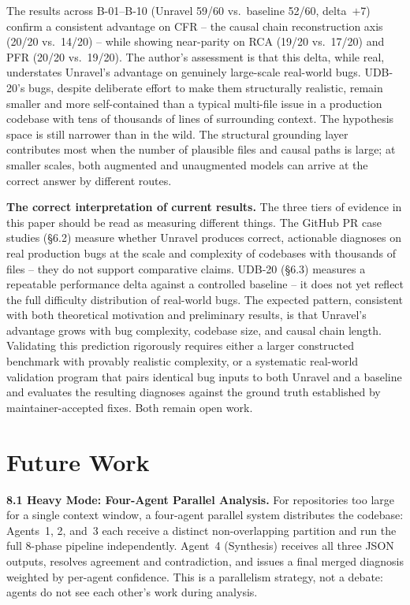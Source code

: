 \documentclass[12pt,a4paper]{article}
\begin{document}
The results across B-01--B-10 (Unravel 59/60 vs.\ baseline 52/60, delta~$+$7) confirm
a consistent advantage on CFR -- the causal chain reconstruction axis (20/20 vs.~14/20)
-- while showing near-parity on RCA (19/20 vs.~17/20) and PFR (20/20 vs.~19/20).
The author's assessment is that this delta, while real, understates Unravel's
advantage on genuinely large-scale real-world bugs. UDB-20's bugs, despite deliberate effort to make them structurally
realistic, remain smaller and more self-contained than a typical multi-file issue in a
production codebase with tens of thousands of lines of surrounding context. The
hypothesis space is still narrower than in the wild. The structural grounding layer
contributes most when the number of plausible files and causal paths is large; at
smaller scales, both augmented and unaugmented models can arrive at the correct answer
by different routes.

\textbf{The correct interpretation of current results.}
The three tiers of evidence in this paper should be read as measuring different things.
The GitHub PR case studies (\S6.2) measure whether Unravel produces correct, actionable
diagnoses on real production bugs at the scale and complexity of codebases with thousands
of files -- they do not support comparative claims. UDB-20 (\S6.3) measures a repeatable
performance delta against a controlled baseline -- it does not yet reflect the full
difficulty distribution of real-world bugs. The expected pattern, consistent with both
theoretical motivation and preliminary results, is that Unravel's advantage grows with
bug complexity, codebase size, and causal chain length. Validating this prediction
rigorously requires either a larger constructed benchmark with provably realistic
complexity, or a systematic real-world validation program that pairs identical bug
inputs to both Unravel and a baseline and evaluates the resulting diagnoses against
the ground truth established by maintainer-accepted fixes. Both remain open work.

\section{Future Work}

\textbf{8.1 \; Heavy Mode: Four-Agent Parallel Analysis.}
For repositories too large for a single context window, a four-agent parallel system
distributes the codebase: Agents~1, 2, and~3 each receive a distinct non-overlapping
partition and run the full 8-phase pipeline independently. Agent~4 (Synthesis) receives
all three JSON outputs, resolves agreement and contradiction, and issues a final merged
diagnosis weighted by per-agent confidence. This is a parallelism strategy, not a debate:
agents do not see each other's work during analysis.
\end{document}
